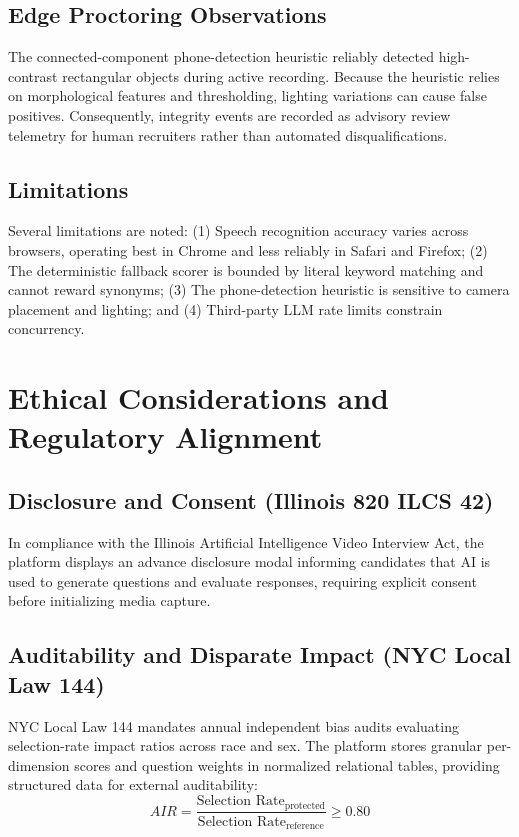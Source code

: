 \documentclass[conference]{IEEEtran}
\begin{document}
\subsection{Edge Proctoring Observations}

The connected-component phone-detection heuristic reliably detected high-contrast rectangular objects during active recording. Because the heuristic relies on morphological features and thresholding, lighting variations can cause false positives. Consequently, integrity events are recorded as advisory review telemetry for human recruiters rather than automated disqualifications.

\subsection{Limitations}

Several limitations are noted: (1) Speech recognition accuracy varies across browsers, operating best in Chrome and less reliably in Safari and Firefox; (2) The deterministic fallback scorer is bounded by literal keyword matching and cannot reward synonyms; (3) The phone-detection heuristic is sensitive to camera placement and lighting; and (4) Third-party LLM rate limits constrain concurrency.

\section{Ethical Considerations and Regulatory Alignment}

\subsection{Disclosure and Consent (Illinois 820 ILCS 42)}

In compliance with the Illinois Artificial Intelligence Video Interview Act, the platform displays an advance disclosure modal informing candidates that AI is used to generate questions and evaluate responses, requiring explicit consent before initializing media capture.

\subsection{Auditability and Disparate Impact (NYC Local Law 144)}

NYC Local Law 144 mandates annual independent bias audits evaluating selection-rate impact ratios across race and sex. The platform stores granular per-dimension scores and question weights in normalized relational tables, providing structured data for external auditability:
\begin{equation}
AIR = \frac{\text{Selection Rate}_{\text{protected}}}{\text{Selection Rate}_{\text{reference}}} \ge 0.80
\end{equation}
\end{document}
